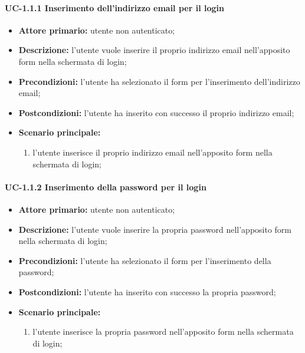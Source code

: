   \paragraph{UC-1.1.1 Inserimento dell'indirizzo email per il login}

	\begin{itemize}
		\item \textbf{Attore primario:} utente non autenticato;

		\item \textbf{Descrizione:} l'utente vuole inserire il proprio indirizzo email nell'apposito form nella schermata di login;

		\item \textbf{Precondizioni:} l'utente ha selezionato il form per l'inserimento dell'indirizzo email;

		\item \textbf{Postcondizioni:} l'utente ha inserito con successo il proprio indirizzo email;

		\item \textbf{Scenario principale:}
	  		\begin{enumerate}
		  		\item l'utente inserisce il proprio indirizzo email nell'apposito form nella schermata di login; 
	  		\end{enumerate}
	\end{itemize}

\paragraph{UC-1.1.2 Inserimento della password per il login}

	\begin{itemize}
		\item \textbf{Attore primario:} utente non autenticato;

		\item \textbf{Descrizione:} l'utente vuole inserire la propria password nell'apposito form nella schermata di login;

		\item \textbf{Precondizioni:} l'utente ha selezionato il form per l'inserimento della password;

		\item \textbf{Postcondizioni:} l'utente ha inserito con successo la propria password;

		\item \textbf{Scenario principale:}
	  		\begin{enumerate}
			  \item l'utente inserisce la propria password nell'apposito form nella schermata di login; 
	  		\end{enumerate}
	\end{itemize}


